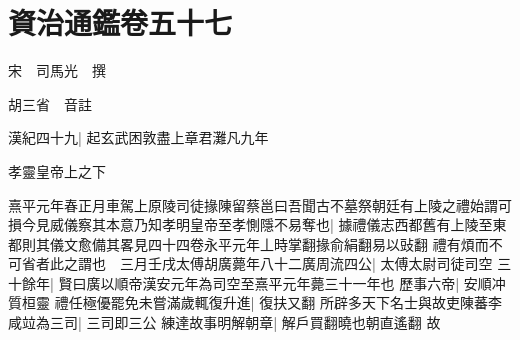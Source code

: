 \chapter{資治通鑑卷五十七}
宋　司馬光　撰

胡三省　音註

漢紀四十九|{
	起玄武困敦盡上章君灘凡九年}


孝靈皇帝上之下

熹平元年春正月車駕上原陵司徒掾陳留蔡邕曰吾聞古不墓祭朝廷有上陵之禮始謂可損今見威儀察其本意乃知孝明皇帝至孝惻隱不易奪也|{
	據禮儀志西都舊有上陵至東都則其儀文愈備其畧見四十四卷永平元年丄時掌翻掾俞絹翻易以䜴翻}
禮有煩而不可省者此之謂也　三月壬戌太傅胡廣薨年八十二廣周流四公|{
	太傅太尉司徒司空}
三十餘年|{
	賢曰廣以順帝漢安元年為司空至熹平元年薨三十一年也}
歷事六帝|{
	安順冲質桓靈}
禮任極優罷免未嘗滿歲輒復升進|{
	復扶又翻}
所辟多天下名士與故吏陳蕃李咸竝為三司|{
	三司即三公}
練達故事明解朝章|{
	解戶買翻曉也朝直遙翻}
故

